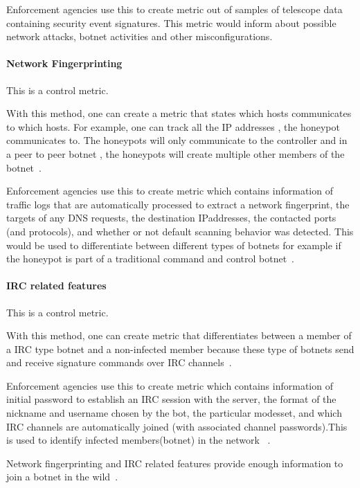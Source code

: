 Enforcement agencies use this to create metric out of samples of telescope data containing security event signatures. This metric would inform about possible network attacks, botnet activities and other misconfigurations.


\paragraph{Network Fingerprinting}
This is a control metric.

With this method, one can create a metric that states which hosts communicates to which hosts. For example, one can track all the IP addresses , the honeypot communicates to. The honeypots will only communicate to the controller and in a peer to peer botnet , the honeypots will create multiple other members of the botnet~\cite{GJ2007}.

Enforcement agencies use this to create metric which contains information of traffic logs that are automatically processed to extract a network fingerprint, the targets of any DNS requests, the destination IPaddresses, the contacted ports (and protocols), and whether or not default scanning behavior was detected. This would be used to differentiate between different types of botnets for example if the honeypot is part of a traditional command and control botnet~\cite{AM2006}.


\paragraph{IRC related features}
This is a control metric.

With this method, one can create metric that differentiates between a member of a IRC type botnet and a non-infected member because these type of botnets send and receive signature commands over IRC channels~\cite{AM2006}.

Enforcement agencies use this to create metric which contains information of initial password to establish an IRC session with the server, the format of the nickname and username chosen by the bot, the particular modesset, and which IRC channels are automatically joined (with associated channel passwords).This is used to  identify infected members(botnet) in the network ~\cite{AM2006}. 

Network fingerprinting and IRC related features provide enough information to join a botnet in the wild~\cite{AM2006}.

